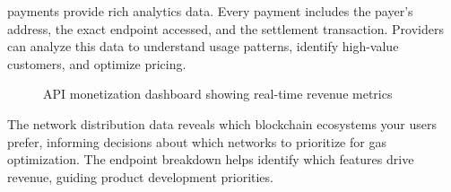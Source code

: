 \tprotocol{} payments provide rich analytics data. Every payment includes the payer's address, the exact endpoint accessed, and the settlement transaction. Providers can analyze this data to understand usage patterns, identify high-value customers, and optimize pricing.

\begin{figure}[htbp]
\centering
{}
\caption{API monetization dashboard showing real-time revenue metrics}
\label{fig:api-dashboard}
\end{figure}

The network distribution data reveals which blockchain ecosystems your users prefer, informing decisions about which networks to prioritize for gas optimization. The endpoint breakdown helps identify which features drive revenue, guiding product development priorities.

